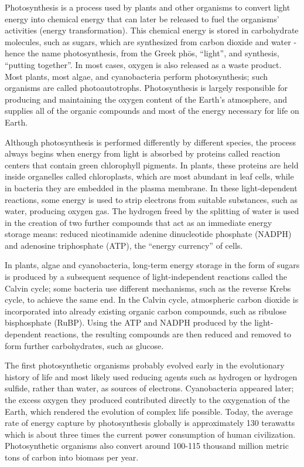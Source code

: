 \documentclass[]{book}
\theoremstyle{definition}
\theoremstyle{definition}
\theoremstyle{definition}
\theoremstyle{remark}
\begin{document}
Photosynthesis is a process used by plants and other organisms to
convert light energy into chemical energy that can later be released to
fuel the organisms' activities (energy transformation). This chemical
energy is stored in carbohydrate molecules, such as sugars, which are
synthesized from carbon dioxide and water - hence the name
photosynthesis, from the Greek phōs, ``light'', and synthesis, ``putting
together''. In most cases, oxygen is also released as a waste product.
Most plants, most algae, and cyanobacteria perform photosynthesis; such
organisms are called photoautotrophs. Photosynthesis is largely
responsible for producing and maintaining the oxygen content of the
Earth's atmosphere, and supplies all of the organic compounds and most
of the energy necessary for life on Earth.

Although photosynthesis is performed differently by different species,
the process always begins when energy from light is absorbed by proteins
called reaction centers that contain green chlorophyll pigments. In
plants, these proteins are held inside organelles called chloroplasts,
which are most abundant in leaf cells, while in bacteria they are
embedded in the plasma membrane. In these light-dependent reactions,
some energy is used to strip electrons from suitable substances, such as
water, producing oxygen gas. The hydrogen freed by the splitting of
water is used in the creation of two further compounds that act as an
immediate energy storage means: reduced nicotinamide adenine
dinucleotide phosphate (NADPH) and adenosine triphosphate (ATP), the
``energy currency'' of cells.

In plants, algae and cyanobacteria, long-term energy storage in the form
of sugars is produced by a subsequent sequence of light-independent
reactions called the Calvin cycle; some bacteria use different
mechanisms, such as the reverse Krebs cycle, to achieve the same end. In
the Calvin cycle, atmospheric carbon dioxide is incorporated into
already existing organic carbon compounds, such as ribulose bisphosphate
(RuBP). Using the ATP and NADPH produced by the light-dependent
reactions, the resulting compounds are then reduced and removed to form
further carbohydrates, such as glucose.

The first photosynthetic organisms probably evolved early in the
evolutionary history of life and most likely used reducing agents such
as hydrogen or hydrogen sulfide, rather than water, as sources of
electrons. Cyanobacteria appeared later; the excess oxygen they produced
contributed directly to the oxygenation of the Earth, which rendered the
evolution of complex life possible. Today, the average rate of energy
capture by photosynthesis globally is approximately 130 terawatts which
is about three times the current power consumption of human
civilization. Photosynthetic organisms also convert around 100-115
thousand million metric tons of carbon into biomass per year.
\end{document}
